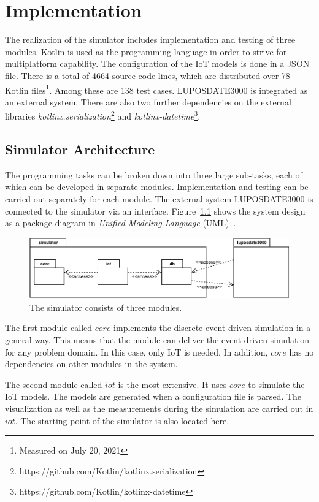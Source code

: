 \documentclass[english,version-2019-11]{uzl-thesis}
\begin{document}
\chapter{Implementation}
\label{chapter_Implementation}
The realization of the simulator includes implementation and testing of three modules. Kotlin is used as the programming language in order to strive for multiplatform capability. The configuration of the IoT models is done in a JSON file. There is a total of 4664 source code lines, which are distributed over 78 Kotlin files\footnote{Measured on July 20, 2021}. Among these are 138 test cases. LUPOSDATE3000 is integrated as an external system. There are also two further dependencies on the external libraries \emph{kotlinx.serialization}\footnote{https://github.com/Kotlin/kotlinx.serialization} and \emph{kotlinx-datetime}\footnote{https://github.com/Kotlin/kotlinx-datetime}.
\section{Simulator Architecture}
The programming tasks can be broken down into three large sub-tasks, each of which can be developed in separate modules. Implementation and testing can be carried out separately for each module. The external system LUPOSDATE3000 is connected to the simulator via an interface. Figure~\ref{figure_architecture} shows the system design as a package diagram in \emph{Unified Modeling Language} (UML)~\cite{UML_Spec}.
\begin{figure}[htpb]
  \centering
  \includegraphics[scale=0.9]{figure_architecture.pdf}
  \caption{The simulator consists of three modules.}
  \label{figure_architecture}
\end{figure}

The first module called $core$ implements the discrete event-driven simulation in a general way. This means that the module can deliver the event-driven simulation for any problem domain. In this case, only IoT is needed. In addition, $core$ has no dependencies on other modules in the system.

The second module called $iot$ is the most extensive. It uses $core$ to simulate the IoT models. The models are generated when a configuration file is parsed. The visualization as well as the measurements during the simulation are carried out in $iot$. The starting point of the simulator is also located here.
\end{document}
